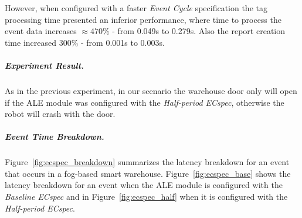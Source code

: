 However, when configured with a faster \textit{Event Cycle} specification the tag processing time
presented an inferior performance, where time to process the event data increases $\approx470\%$
- from 0.049s to 0.279s. Also the report creation time increased $300\%$ - from 0.001s to 0.003s.

\subparagraph{Experiment Result.}
\label{subp:fog_experiment_result}
As in the previous experiment, in our scenario the warehouse door only will open if the \gls{ALE}
module was configured with the \textit{Half-period ECspec}, otherwise the robot will crash with
the door.

\subparagraph{Event Time Breakdown.}
\label{subp:fog_event_breakdown}
Figure~\ref{fig:ecspec_breakdown} summarizes the latency breakdown for an event that occurs in a fog-based
smart warehouse. Figure~\ref{fig:ecspec_base} shows the latency breakdown for an event when the
\gls{ALE} module is configured with the \textit{Baseline ECspec} and in Figure~\ref{fig:ecspec_half}
when it is configured with the \textit{Half-period ECspec}.\\

